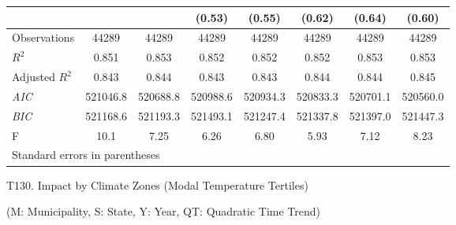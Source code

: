 \documentclass[paper=letterpaper, fontsize=11pt]{article} %
\begin{document}
{\begin{landscape}
\begin{longtable}{l*{7}{c}}
                    &            &            &      (0.53)&      (0.55)&      (0.62)&      (0.64)&      (0.60)\\
\hline
Observations        &       44289&       44289&       44289&       44289&       44289&       44289&       44289\\
\(R^{2}\)           &       0.851&       0.853&       0.852&       0.852&       0.852&       0.853&       0.853\\
Adjusted \(R^{2}\)  &       0.843&       0.844&       0.843&       0.843&       0.844&       0.844&       0.845\\
\textit{AIC}        &    521046.8&    520688.8&    520988.6&    520934.3&    520833.3&    520701.1&    520560.0\\
\textit{BIC}        &    521168.6&    521193.3&    521493.1&    521247.4&    521337.8&    521397.0&    521447.3\\
F                   &        10.1&        7.25&        6.26&        6.80&        5.93&        7.12&        8.23\\
\hline\hline
\multicolumn{8}{l}{\footnotesize Standard errors in parentheses}\\
\end{longtable}

\end{landscape}}

\newpage

\begin{center}
T130. Impact by Climate Zones (Modal Temperature Tertiles)

(M: Municipality, S: State, Y: Year, QT: Quadratic Time Trend)
\end{center}
\end{document}
